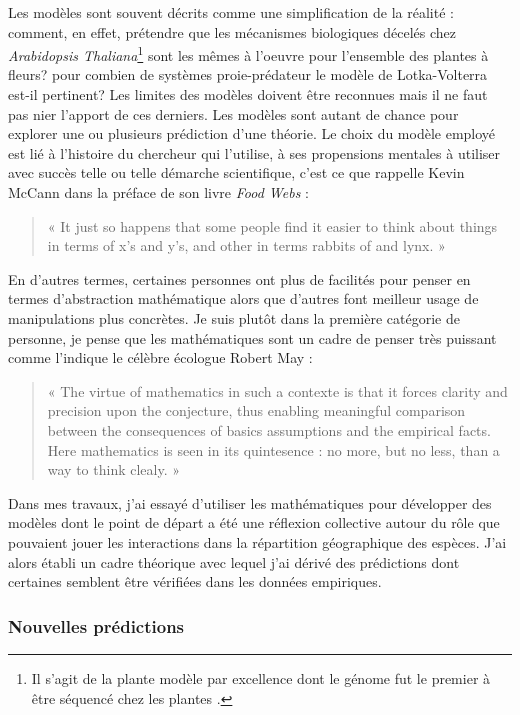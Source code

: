 Les modèles sont souvent décrits comme une simplification de la réalité
: comment, en effet, prétendre que les mécanismes biologiques décelés
chez \emph{Arabidopsis Thaliana}\footnote{Il s'agit de la plante modèle
  par excellence dont le génome fut le premier à être séquencé chez les
  plantes \citep{TheArabidopsisGenomeInitiative2000}.} sont les mêmes à
l'oeuvre pour l'ensemble des plantes à fleurs? pour combien de systèmes
proie-prédateur le modèle de Lotka-Volterra est-il pertinent? Les
limites des modèles doivent être reconnues mais il ne faut pas nier
l'apport de ces derniers. Les modèles sont autant de chance pour
explorer une ou plusieurs prédiction d'une théorie. Le choix du modèle
employé est lié à l'histoire du chercheur qui l'utilise, à ses
propensions mentales à utiliser avec succès telle ou telle démarche
scientifique, c'est ce que rappelle Kevin McCann dans la préface de son
livre \emph{Food Webs} \citep{mccann2011food}:

\begin{quote}
« It just so happens that some people find it easier to think about
things in terms of x's and y's, and other in terms rabbits of and lynx.
»
\end{quote}

En d'autres termes, certaines personnes ont plus de facilités pour
penser en termes d'abstraction mathématique alors que d'autres font
meilleur usage de manipulations plus concrètes. Je suis plutôt dans la
première catégorie de personne, je pense que les mathématiques sont un
cadre de penser très puissant comme l'indique le célèbre écologue Robert
May \citep{May2004}:

\begin{quote}
« The virtue of mathematics in such a contexte is that it forces clarity
and precision upon the conjecture, thus enabling meaningful comparison
between the consequences of basics assumptions and the empirical facts.
Here mathematics is seen in its quintesence : no more, but no less, than
a way to think clealy. »
\end{quote}

Dans mes travaux, j'ai essayé d'utiliser les mathématiques pour
développer des modèles dont le point de départ a été une réflexion
collective autour du rôle que pouvaient jouer les interactions dans la
répartition géographique des espèces. J'ai alors établi un cadre
théorique avec lequel j'ai dérivé des prédictions dont certaines
semblent être vérifiées dans les données empiriques.

\subsubsection*{Nouvelles prédictions}\label{nouvelles-pruxe9dictions}

